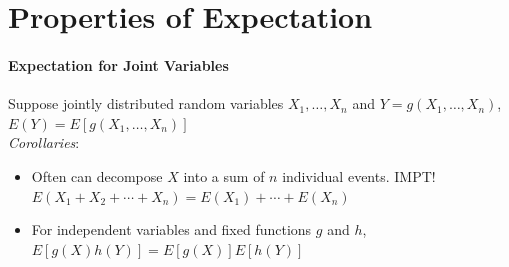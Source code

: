 \section{Properties of Expectation}
\paragraph{Expectation for Joint Variables}
Suppose jointly distributed random variables $X_1,\ldots,X_n$ and
$Y=g(X_1,\ldots,X_n)$,\\
\(E(Y)=E[g(X_1,\ldots,X_n)]\)\\
\emph{Corollaries}:
\begin{itemize}
  \item Often can decompose $X$ into a sum of $n$ individual events. IMPT!\@
    $E(X_1+X_2+\cdots+X_n)=E(X_1)+\cdots+E(X_n)$
  \item For \textcolor{Bittersweet}{independent} variables and fixed functions $g$ and
    $h$, $E[g(X)h(Y)]=E[g(X)]E[h(Y)]$
\end{itemize}
